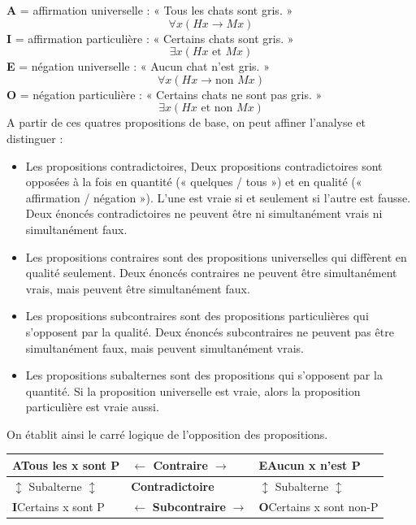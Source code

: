 \noindent\textbf{A} = affirmation universelle : « Tous les chats sont gris. »
\[\forall x(Hx\to Mx)\]
\noindent\textbf{I} = affirmation particulière : « Certains chats sont gris. »
\[\exists x(Hx\text{ et }Mx)\]
\noindent\textbf{E} = négation universelle : « Aucun chat n’est gris. »
\[\forall x(Hx\to\text{non }Mx)\]
\noindent\textbf{O} = négation particulière : « Certains chats ne sont pas gris. »
\[\exists x(Hx\text{ et non }Mx)\]
A partir de ces quatres propositions de base, on peut affiner l’analyse et distinguer :
\begin{itemize}
\item Les propositions contradictoires, Deux propositions contradictoires sont opposées à la fois en quantité (« quelques / tous ») et en qualité (« affirmation / négation »). L’une est vraie si et seulement si l’autre est fausse. Deux énoncés contradictoires ne peuvent être ni simultanément vrais ni simultanément faux.
\item Les propositions contraires sont des propositions universelles qui diffèrent en qualité seulement. Deux énoncés contraires ne peuvent être simultanément vrais, mais peuvent être simultanément faux.
\item Les propositions subcontraires sont des propositions particulières qui s’opposent par la qualité. Deux énoncés subcontraires ne peuvent pas être simultanément faux, mais peuvent simultanément vrais.
\item Les propositions subalternes sont des propositions qui s’opposent par la quantité. Si la proposition universelle est vraie, alors la proposition particulière est vraie aussi.
\end{itemize}
On établit ainsi le carré logique de l’opposition des propositions.

\begin{center}\small
\renewcommand{\arraystretch}{1.25}
\begin{tabularx}{\linewidth}{|>{\centering\arraybackslash}X|>{\centering\arraybackslash}X|>{\centering\arraybackslash}X|}
\hline
\textbf{A}\newline Tous les x sont P & $\leftarrow$ \textbf{Contraire} $\rightarrow$ & \textbf{E}\newline Aucun x n’est P\\\hline
$\updownarrow$ Subalterne $\updownarrow$ & \textbf{Contradictoire} & $\updownarrow$ Subalterne $\updownarrow$\\\hline
\textbf{I}\newline Certains x sont P & $\leftarrow$ \textbf{Subcontraire} $\rightarrow$ & \textbf{O}\newline Certains x sont non-P\\\hline
\end{tabularx}
\end{center}

